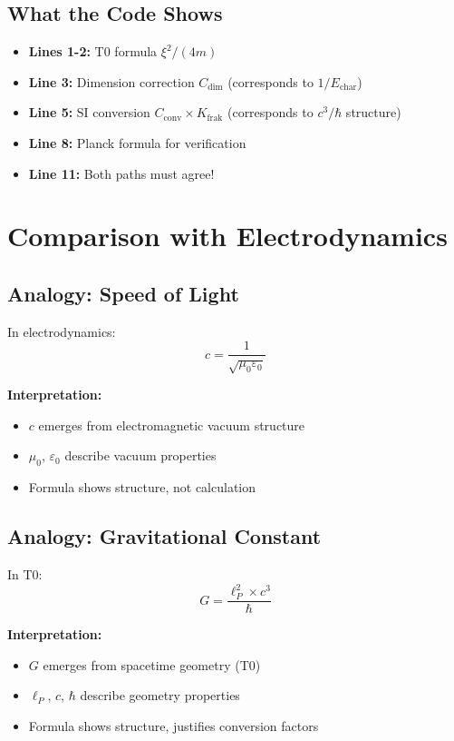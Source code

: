 	\subsection{What the Code Shows}
	
	\begin{itemize}
		\item \textbf{Lines 1-2:} T0 formula $\xi^2/(4m)$
		\item \textbf{Line 3:} Dimension correction $C_{\text{dim}}$ (corresponds to $1/E_{\text{char}}$)
		\item \textbf{Line 5:} SI conversion $C_{\text{conv}} \times K_{\text{frak}}$ (corresponds to $c^3/\hbar$ structure)
		\item \textbf{Line 8:} Planck formula for verification
		\item \textbf{Line 11:} Both paths must agree!
	\end{itemize}
	
	\section{Comparison with Electrodynamics}
	
	\subsection{Analogy: Speed of Light}
	
	In electrodynamics:
	\begin{equation}
		c = \frac{1}{\sqrt{\mu_0 \varepsilon_0}}
	\end{equation}
	
	\textbf{Interpretation:}
	\begin{itemize}
		\item $c$ emerges from electromagnetic vacuum structure
		\item $\mu_0$, $\varepsilon_0$ describe vacuum properties
		\item Formula shows structure, not calculation
	\end{itemize}
	
	\subsection{Analogy: Gravitational Constant}
	
	In T0:
	\begin{equation}
		G = \frac{\ell_P^2 \times c^3}{\hbar}
	\end{equation}
	
	\textbf{Interpretation:}
	\begin{itemize}
		\item $G$ emerges from spacetime geometry (T0)
		\item $\ell_P$, $c$, $\hbar$ describe geometry properties
		\item Formula shows structure, justifies conversion factors
	\end{itemize}
	
